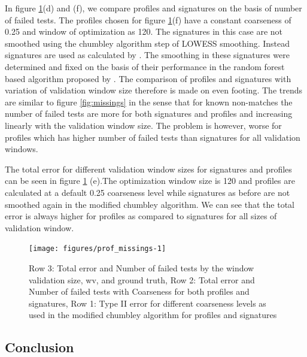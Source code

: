 \documentclass[12pt]{article}
\begin{document}
In figure \ref{fig:prof_missings}(d) and (f), we compare profiles and
signatures on the basis of number of failed tests. The profiles chosen
for figure \ref{fig:prof_missings}(f) have a constant coarseness of 0.25
and window of optimization as 120. The signatures in this case are not
smoothed using the chumbley algorithm step of LOWESS smoothing. Instead
signatures are used as calculated by \citet{aoas}. The smoothing in
these signatures were determined and fixed on the basis of their
performance in the random forest based algorithm proposed by
\citet{aoas}. The comparison of profiles and signatures with variation
of validation window size therefore is made on even footing. The trends
are similar to figure \ref{fig:missings} in the sense that for known
non-matches the number of failed tests are more for both signatures and
profiles and increasing linearly with the validation window size. The
problem is however, worse for profiles which has higher number of failed
tests than signatures for all validation windows.

The total error for different validation window sizes for signatures and
profiles can be seen in figure \ref{fig:prof_missings} (e).The
optimization window size is 120 and profiles are calculated at a default
0.25 coarseness level while signatures as before are not smoothed again
in the modified chumbley algorithm. We can see that the total error is
always higher for profiles as compared to signatures for all sizes of
validation window.

\begin{figure}

{\centering \texttt{[image: figures/prof\_missings-1]} 

}

\caption{Row 3:  Total error and Number of failed tests by the window validation size, wv, and ground truth, Row 2: Total error and Number of failed tests with Coarseness for both profiles and signatures, Row 1: Type II error for different coarseness levels as used in the modified chumbley algorithm for profiles and signatures}\label{fig:prof_missings}
\end{figure}

\pagebreak

\subsection{Conclusion}\label{conclusion}
\end{document}
